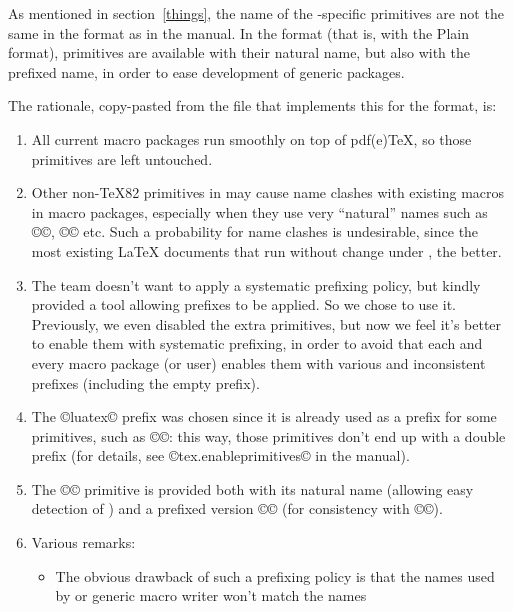 \documentclass{lltxdoc}
\begin{document}
As mentioned in section~\ref{things}, the name of the \luatex-specific
primitives are not the same in the  format as in the \luatex
manual. In the  format (that is, \luatex with the Plain format),
primitives are available with their natural name, but also with the prefixed
name, in order to ease development of generic packages.

The rationale, copy-pasted from the file  that
implements this for the  format, is:

\begin{myquote}
  \begin{enumerate}
    \item All current macro packages run smoothly on top of pdf(e)TeX, so
      those primitives are left untouched.
    \item Other non-TeX82 primitives in \luatex may cause name clashes with
      existing macros in macro packages, especially when they use very
      ``natural'' names such as ©\outputbox©, ©\mathstyle© etc. Such a
      probability for name clashes is undesirable, since the most existing
      LaTeX documents that run without change under \luatex, the better.
    \item The \luatex team doesn't want to apply a systematic prefixing policy,
      but kindly provided a tool allowing prefixes to be applied. So we chose
      to use it.  Previously, we even disabled the extra primitives, but now
      we feel it's better to enable them with systematic prefixing, in order
      to avoid that each and every macro package (or user) enables them with
      various and inconsistent prefixes (including the empty prefix).
    \item The ©luatex© prefix was chosen since it is already used as a prefix
      for some primitives, such as ©\luatexversion©: this way, those
      primitives don't end up with a double prefix (for details, see
      ©tex.enableprimitives© in the \luatex manual).
    \item The ©\directlua© primitive is provided both with its natural name
      (allowing easy detection of \luatex) and a prefixed version
      ©\luatexdirectlua© (for consistency with ©\luatexlatelua©).
    \item Various remarks:
      \begin{itemize}
        \item The obvious drawback of such a prefixing policy is that the
          names used by \latex or generic macro writer won't match the names

\end{itemize}
\end{enumerate}
\end{myquote}
\end{document}
